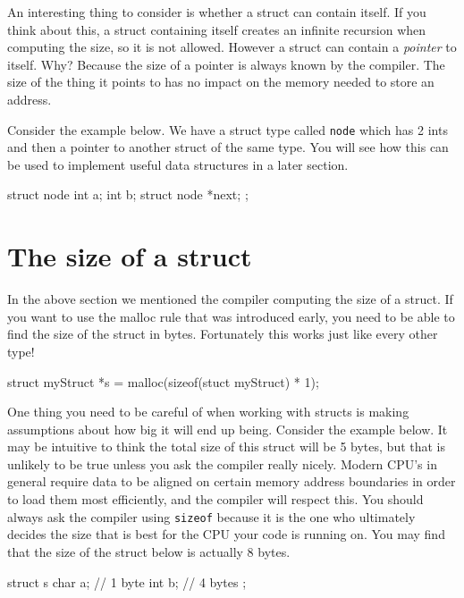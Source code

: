 An interesting thing to consider is whether a struct can contain itself.
If you think about this, a struct containing itself creates an infinite recursion when computing the size, so it is not allowed.
However a struct can contain a \emph{pointer} to itself.
Why?
Because the size of a pointer is always known by the compiler.
The size of the thing it points to has no impact on the memory needed to store an address.

Consider the example below.
We have a struct type called \texttt{node} which has 2 ints and then a pointer to another struct of the same type.
You will see how this can be used to implement useful data structures in a later section.

\begin{codeblock}
struct node {
    int a;
    int b;
    struct node *next;
};
\end{codeblock}

\section{The size of a struct}

In the above section we mentioned the compiler computing the size of a struct.
If you want to use the malloc rule that was introduced early, you need to be able to find the size of the struct in bytes.
Fortunately this works just like every other type!

\begin{codeinline}
struct myStruct *s = malloc(sizeof(stuct myStruct) * 1);
\end{codeinline}

One thing you need to be careful of when working with structs is making assumptions about how big it will end up being.
Consider the example below.
It may be intuitive to think the total size of this struct will be 5 bytes, but that is unlikely to be true unless you ask the compiler really nicely.
Modern CPU's in general require data to be aligned on certain memory address boundaries in order to load them most efficiently, and the compiler will respect this.
You should always ask the compiler using \texttt{sizeof} because it is the one who ultimately decides the size that is best for the CPU your code is running on.
You may find that the size of the struct below is actually 8 bytes.

\begin{codeblock}
struct s {
    char a; // 1 byte
    int b; // 4 bytes
};
\end{codeblock}

